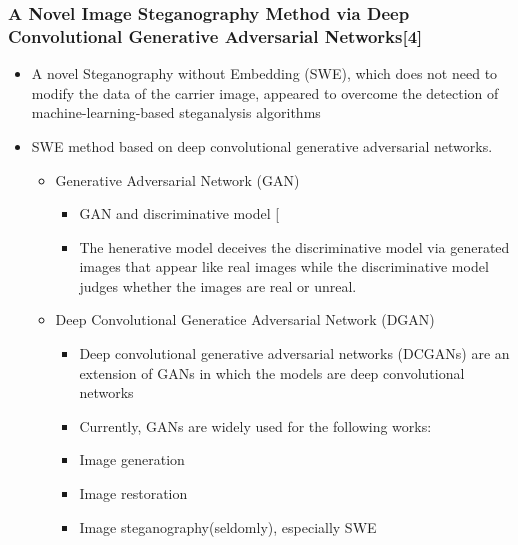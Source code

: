 \documentclass{beamer} %
\theoremstyle{definition} %
\begin{document}
\begin{frame}
\frametitle{A Novel Image Steganography Method via Deep Convolutional Generative Adversarial Networks[4]  }
\begin{itemize}
	\item A novel Steganography without Embedding (SWE), which does not need to modify the data of the carrier image, appeared to overcome the detection of machine-learning-based steganalysis algorithms 
	\item SWE method based on deep convolutional generative adversarial networks.
	\begin{itemize}
		\item Generative Adversarial Network (GAN)
		\begin{itemize}
		    \item  GAN and discriminative model [ 
		    \item The henerative model deceives the discriminative model via generated images that appear like real images while the discriminative
		    model judges whether the images are real or unreal. 
		\end{itemize}
		\item Deep Convolutional Generatice Adversarial Network (DGAN)
		\begin{itemize}
		    \item Deep convolutional generative adversarial networks (DCGANs) are an extension of GANs in which the models are deep convolutional
		    networks 
		    \item Currently, GANs are widely used for the following works: 
		    \item Image generation 
		    \item Image restoration
		    \item Image steganography(seldomly), especially SWE  
		\end{itemize}
			\end{itemize}
		\end{itemize}
\end{frame}
\end{document}
